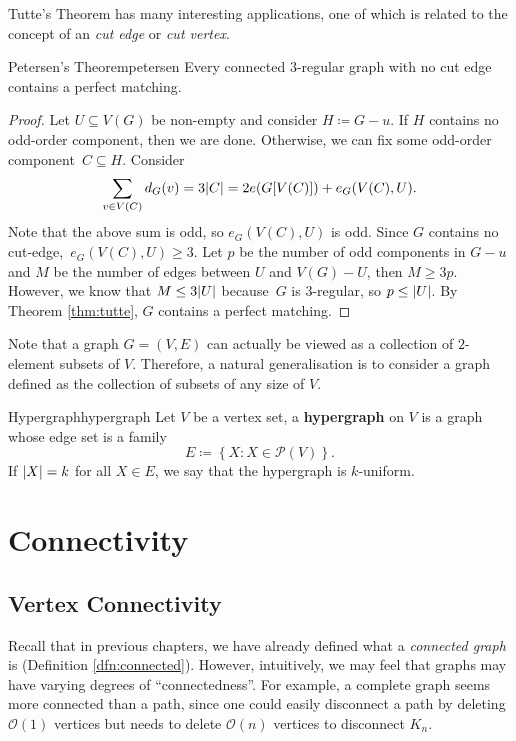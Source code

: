 \documentclass[math]{amznotes}
\theoremstyle{remark}
\newcommand{\0}{\mathbf{0}}
\newcommand{\1}{\mathbf{1}}
\begin{document}
Tutte's Theorem has many interesting applications, one of which is related to the concept of an \textit{cut edge} or \textit{cut vertex}.
\begin{thmbox}{Petersen's Theorem}{petersen}
    Every connected $3$-regular graph with no cut edge contains a perfect matching.
    \tcblower
    \begin{proof}
        Let $U \subseteq V(G)$ be non-empty and consider $H \coloneqq G - u$. If $H$ contains no odd-order component, then we are done. Otherwise, we can fix some odd-order component~$C \subseteq H$. Consider
        \begin{equation*}
            \sum_{v \in V(C)}d_G(v) = 3{\left\lvert {C} \right\rvert} = 2e(G[V(C)]) + e_G(V(C), U).
        \end{equation*}
        Note that the above sum is odd, so $e_G(V(C), U)$ is odd. Since $G$ contains no cut-edge,~$e_G(V(C), U) \geq 3$. Let $p$ be the number of odd components in $G - u$ and $M$ be the number of edges between $U$ and $V(G) - U$, then $M \geq 3p$. However, we know that $M \leq 3{\left\lvert {U} \right\rvert}$ because~$G$ is $3$-regular, so $p \leq {\left\lvert {U} \right\rvert}$. By Theorem \ref{thm:tutte}, $G$ contains a perfect matching.
    \end{proof}
\end{thmbox}
Note that a graph $G = (V, E)$ can actually be viewed as a collection of $2$-element subsets of $V$. Therefore, a natural generalisation is to consider a graph defined as the collection of subsets of any size of $V$.
\begin{dfnbox}{Hypergraph}{hypergraph}
    Let $V$ be a vertex set, a {\color{red} \textbf{hypergraph}} on $V$ is a graph whose edge set is a family
    \begin{equation*}
        E \coloneqq \left\{X \colon X \in \mathcal{P}(V)\right\}.
    \end{equation*}
    If ${\left\lvert {X} \right\rvert} = k$ for all $X \in E$, we say that the hypergraph is $k$-uniform.
\end{dfnbox}
\chapter{Connectivity}
\section{Vertex Connectivity}
Recall that in previous chapters, we have already defined what a \textit{connected graph} is (Definition \ref{dfn:connected}). However, intuitively, we may feel that graphs may have varying degrees of ``connectedness''. For example, a complete graph seems more connected than a path, since one could easily disconnect a path by deleting $\mathcal{O}(1)$ vertices but needs to delete $\mathcal{O}(n)$ vertices to disconnect $K_n$.
\end{document}
